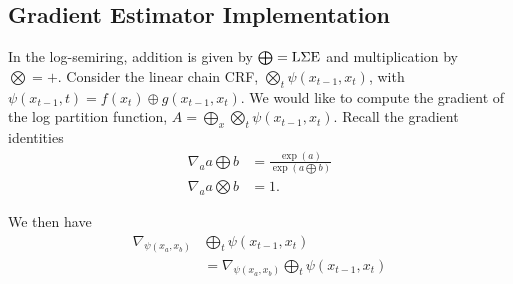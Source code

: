 \documentclass{article}
\begin{document}
\begin{appendix}
\section{Gradient Estimator Implementation}
In the log-semiring, addition is given by $\bigoplus = \LSE$ and multiplication
by $\bigotimes = +$.
Consider the linear chain CRF, $\bigotimes_t \psi(x_{t-1}, x_t)$,
with $\psi(x_{t-1}, t) = f(x_t) \oplus g(x_{t-1},x_t)$.
We would like to compute the gradient of the
log partition function, $A = \bigoplus_x \bigotimes_t \psi(x_{t-1}, x_t)$.
Recall the gradient identities 
\begin{equation}
\begin{aligned}
\nabla_a a \bigoplus b &= \frac{\exp(a)}{\exp(a \bigoplus b)}\\
\nabla_a a \bigotimes b &= 1.
\end{aligned}
\end{equation}

We then have 
\begin{equation}
\begin{aligned}
\nabla_{\psi(x_a,x_b)} &\bigoplus_t \psi(x_{t-1}, x_t)\\
&= \nabla_{\psi(x_a,x_b)} \bigoplus_t \psi(x_{t-1}, x_t)\\
\end{aligned}
\end{equation}


\end{appendix}
\end{document}
